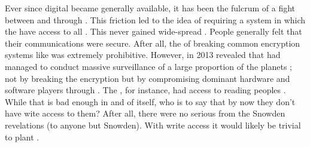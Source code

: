 Ever since digital  became generally available, it has been the fulcrum of a fight between  and  through . This friction led to the idea of requiring a  system in which the  have access to all . This never gained wide-spread . People generally felt that their communications were secure. After all, the  of breaking common encryption systems like  was extremely prohibitive. However, in 2013  revealed that  had managed to conduct massive surveillance of a large proportion of the planets ; not by breaking the encryption but by compromising dominant hardware and software players through . The , for instance, had access to reading peoples . While that is bad enough in and of itself, who is to say that by now they don't have wite access to them? After all, there were no serious  from the Snowden revelations (to anyone but Snowden). With write access it would likely be trivial to plant .

